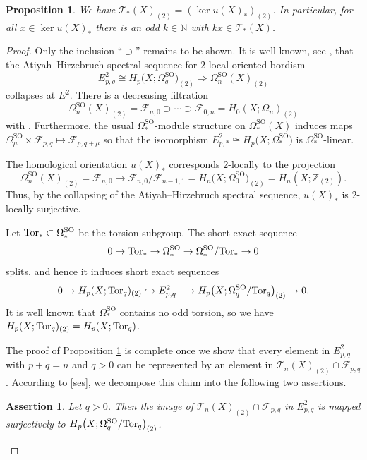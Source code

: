 \documentclass[pdftex]{sigma}
\numberwithin{equation}{section}
\newtheorem{Proposition}[Theorem]{Proposition}
\newtheorem{Assertion}[Theorem]{Assertion}
\newcommand{\Z}{\mathbb{Z}}
\newcommand{\N}{\mathbb{N}}
\newcommand{\SO}{\mathrm{SO}}
\newcommand{\Tor}{{\rm Tor}}
\begin{document}
 \begin{Proposition} \label{crucial} We have
$
 \mathscr{T}_*(X)_{(2)} = (\ker u(X)_*)_{(2)}$.
 In particular, for all $x \in \ker u(X)_*$ there is an odd $k \in \N$ with $kx \in \mathscr{T}_*(X)$.
\end{Proposition}

\begin{proof}
Only the inclusion ``$\supset$'' remains to be shown.
It is well known, see \cite[Chapter 2]{CF}, that the Atiyah--Hirzebruch spectral sequence for $2$-local oriented bordism
\[
 E^2_{p,q} \cong H_p\big(X; \Omega^{\SO}_q\big)_{(2)} \Longrightarrow \Omega^{\SO}_{n}(X)_{(2)}
 \]
collapses at $E^2$.
There is a decreasing filtration
\[
 \Omega^{\SO}_{n}(X)_{(2)} = \mathscr{F}_{n,0} \supset \cdots \supset \mathscr{F}_{0,n} = H_0(X ; \Omega_n)_{(2)}
\]
with .
Furthermore, the usual $\Omega^{\SO}_*$-module structure on $\Omega^{\SO}_*(X)$ induces maps
$
 \Omega^{\SO}_{\mu} \times \mathscr{F}_{p, q} \mapsto \mathscr{F}_{p, q+\mu}
$
so that the isomorphism $E^2_{p,*} \cong H_p\big(X; \Omega^{\SO}_*\big)$ is $\Omega^{\SO}_*$-linear.

The homological orientation $u(X)_*$ corresponds $2$-locally to the projection
\[
 \Omega^{\SO}_{n}(X)_{(2)} = \mathscr{F}_{n,0} \to \mathscr{F}_{n,0} / \mathscr{F}_{n-1,1} = H_n\big(X; \Omega^{\SO} _{0}\big)_{(2)} = H_n(X; \Z_{(2)}).
\]
Thus, by the collapsing of the Atiyah--Hirzebruch spectral sequence, $u(X)_*$ is $2$-locally surjective.

Let $\Tor_* \subset \Omega^{\SO}_*$ be the torsion subgroup.
The short exact sequence
\[
 0 \to \Tor_* \to \Omega^{\SO}_* \to \Omega^{\SO}_* / \Tor_* \to 0
\]
splits, and hence it induces short exact sequences
\begin{equation} \label{ses}
 0 \to H_p(X; \Tor_q)_{(2)} \hookrightarrow E^2_{p,q} \longrightarrow H_p\big(X; \Omega^{\SO}_q / \Tor_q\big)_{(2)} \to 0 .
\end{equation}
It is well known that $\Omega^{\SO}_*$ contains no odd torsion, so we have $H_p(X; \Tor_q)_{(2)} = H_p(X; \Tor_q)$.

The proof of Proposition \ref{crucial} is complete once we show that every element in $E^2_{p,q}$ with $p + q = n$ and $q > 0$ can be represented by an element in $\mathscr{T}_n(X)_{(2)} \cap \mathscr{F}_{p,q}$.
According to \eqref{ses}, we decompose this claim into the following two assertions.


\begin{Assertion}\label{Assertion1} Let $q > 0$.
Then the image of $\mathscr{T}_n(X)_{(2)} \cap \mathscr{F}_{p,q}$ in $E^2_{p,q}$ is mapped surjectively to $H_p\big(X; \Omega_q^{\SO} / \Tor_q \big)_{(2)}$.
\end{Assertion}



\end{proof}
\end{document}
